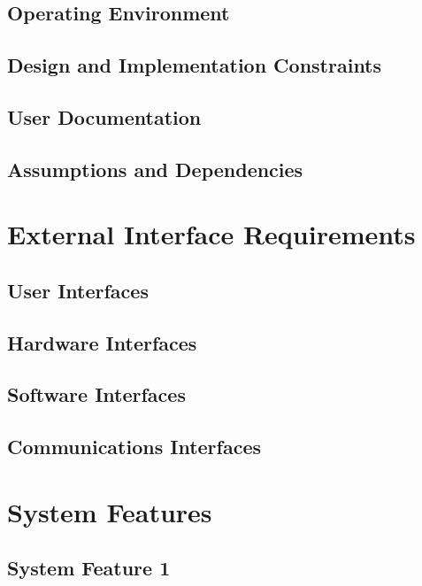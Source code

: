 \section{Operating Environment}

\section{Design and Implementation Constraints}

\section{User Documentation}

\section{Assumptions and Dependencies}

\newpage




\chapter{External Interface Requirements}
\label{External Interface Requirements}

\section{User Interfaces}
\section{Hardware Interfaces}
\section{Software Interfaces}
\section{Communications Interfaces}


\chapter{System Features}
\label{System Features}

\section{System Feature 1}



